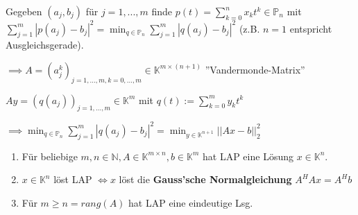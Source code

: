 \begin{example}
	Gegeben $(a_j, b_j)$ für $j=1, ..., m$ finde $p(t) = \sum_{k=0}^{n} x_k t^k \in \mathbb{P}_n$ mit $\sum_{j=1}^{m} |p(a_j) - b_j|^2 = \min_{q \in \mathbb{P}_n} \sum_{j=1}^{m} |q(a_j) - b_j|^2$ (z.B. $n=1$ entspricht Ausgleichsgerade).
	
	$\implies A = (a_j^k)_{j=1, ..., m, k=0, ..., m} \in \mathbb{K}^{m \times (n+1)}$ ''Vandermonde-Matrix''
	
	$Ay = (q(a_j))_{j=1, ..., m} \in \mathbb{K}^m$ mit $q(t) := \sum_{k=0}^{m}y_kt^k$
	
	$\implies \min_{q \in \mathbb{P}_n} \sum_{j=1}^{m} |q(a_j) - b_j|^2 = \min_{y \in \mathbb{K}^{n+1}} ||Ax - b||_2^2$
\end{example}

\begin{theorem}
	\begin{enumerate}
		\item Für beliebige $m,n \in \mathbb{N}, A \in \mathbb{K}^{m \times n}, b \in \mathbb{K}^m$ hat LAP eine Lösung $x \in \mathbb{K}^n$.
		\item $x \in \mathbb{K}^n$ löst LAP $\iff x$ löst die \textbf{Gauss'sche Normalgleichung} $A^HAx = A^Hb$
		\item Für $m \geq n = rang(A)$ hat LAP eine eindeutige Lsg.
	\end{enumerate}
\end{theorem}

